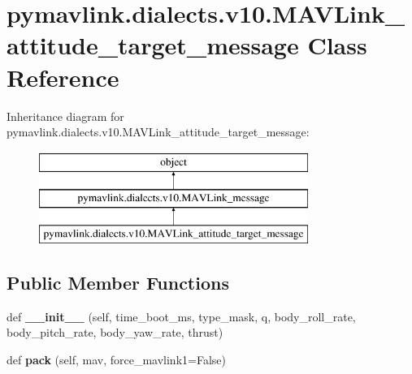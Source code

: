 \hypertarget{classpymavlink_1_1dialects_1_1v10_1_1MAVLink__attitude__target__message}{}\section{pymavlink.\+dialects.\+v10.\+M\+A\+V\+Link\+\_\+attitude\+\_\+target\+\_\+message Class Reference}
\label{classpymavlink_1_1dialects_1_1v10_1_1MAVLink__attitude__target__message}
Inheritance diagram for pymavlink.\+dialects.\+v10.\+M\+A\+V\+Link\+\_\+attitude\+\_\+target\+\_\+message\+:\begin{figure}[H]
\begin{center}
\leavevmode
\includegraphics[height=3.000000cm]{classpymavlink_1_1dialects_1_1v10_1_1MAVLink__attitude__target__message}
\end{center}
\end{figure}
\subsection*{Public Member Functions}
\begin{DoxyCompactItemize}
\item 
\mbox{\label{classpymavlink_1_1dialects_1_1v10_1_1MAVLink__attitude__target__message_a3783c96b86939098e642dd85c1374071}} 
def {\bfseries \+\_\+\+\_\+init\+\_\+\+\_\+} (self, time\+\_\+boot\+\_\+ms, type\+\_\+mask, q, body\+\_\+roll\+\_\+rate, body\+\_\+pitch\+\_\+rate, body\+\_\+yaw\+\_\+rate, thrust)
\item 
\mbox{\label{classpymavlink_1_1dialects_1_1v10_1_1MAVLink__attitude__target__message_a14b0e865adfbf904d1026df8c1ff7c3c}} 
def {\bfseries pack} (self, mav, force\+\_\+mavlink1=False)
\end{DoxyCompactItemize}
